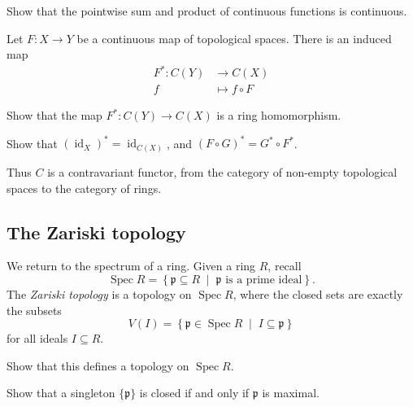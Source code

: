 \documentclass[a4paper,11pt]{article}
\begin{document}
    \begin{exercise}
      Show that the pointwise sum and product of continuous functions is continuous.
    \end{exercise}

    Let \(F: X \to Y\) be a continuous map of topological spaces. There is an induced map
    \begin{align*}
      F^*: C(Y) &\to C(X) \\
      f &\mapsto f \circ F
    \end{align*}

    \begin{exercise}
      Show that the map \(F^*: C(Y) \to C(X)\) is a ring homomorphism.
    \end{exercise}

    \begin{exercise}
      Show that \((\operatorname{id}_X)^* = \operatorname{id}_{C(X)}\), and \((F \circ G)^* = G^* \circ F^*\).
    \end{exercise}

    Thus \(C\) is a contravariant functor, from the category of non-empty topological spaces to the category of rings.

    \subsection{The Zariski topology}
    We return to the spectrum of a ring. Given a ring \(R\), recall
    \[
      \operatorname{Spec}R = \left\{ \mathfrak{p} \subseteq R \; \middle| \; \mathfrak{p}\text{ is a prime ideal} \right\}.
    \]
    The \emph{Zariski topology} is a topology on \(\operatorname{Spec}R\), where the closed sets are exactly the subsets
    \[
      V(I) = \left\{ \mathfrak{p} \in \operatorname{Spec}R \; \middle| \; I \subseteq \mathfrak{p} \right\}
    \]
    for all ideals \(I \subseteq R\).

    \begin{exercise}
      Show that this defines a topology on \(\operatorname{Spec}R\).
    \end{exercise}

    \begin{exercise}
      Show that a singleton \(\{\mathfrak{p}\}\) is closed if and only if \(\mathfrak{p}\) is maximal.
    \end{exercise}
    
\end{document}
